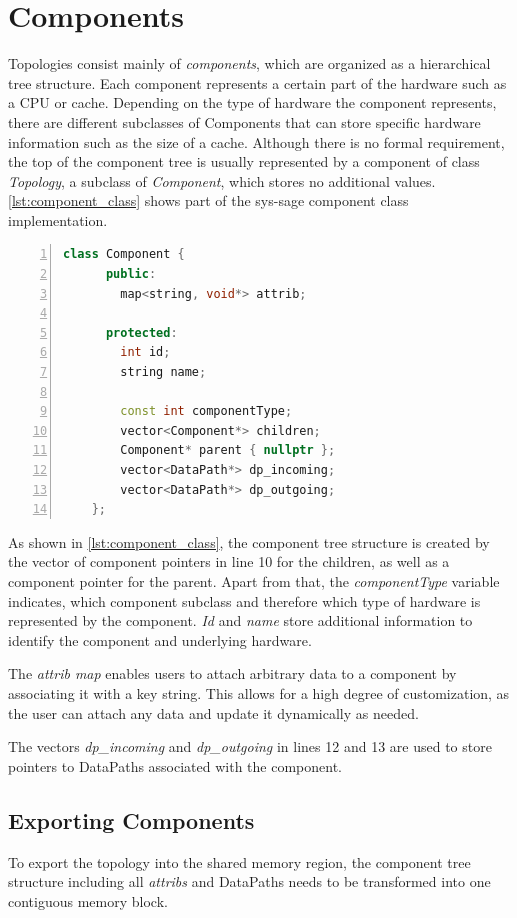 \section{Components}
Topologies consist mainly of \emph{components}, which are organized as a hierarchical tree structure.
Each component represents a certain part of the hardware such as a CPU or cache.
Depending on the type of hardware the component represents, there are different subclasses of Components that can store specific hardware information such as the size of a cache.
Although there is no formal requirement, the top of the component tree is usually represented by a component of class \emph{Topology}, a subclass of \emph{Component},
which stores no additional values.
\autoref{lst:component_class} shows part of the sys-sage component class implementation.

\begin{lstlisting}[language=c++, numbers=left, caption=Component Class, captionpos=b, label={lst:component_class}]
    class Component {
      public:
        map<string, void*> attrib;

      protected:
        int id;
        string name;

        const int componentType;
        vector<Component*> children;
        Component* parent { nullptr };
        vector<DataPath*> dp_incoming;
        vector<DataPath*> dp_outgoing;
    };
\end{lstlisting}

As shown in \autoref{lst:component_class}, the component tree structure is created by the vector of component pointers in line 10 for the children, as well as a component pointer
for the parent.
Apart from that, the \emph{componentType} variable indicates, which component subclass and therefore which type of hardware is represented by the component.
\emph{Id} and \emph{name} store additional information to identify the component and underlying hardware.

The \emph{attrib map} enables users to attach arbitrary data to a component by associating it with a key string. This allows for a high degree of customization,
as the user can attach any data and update it dynamically as needed.

The vectors \emph{dp\_incoming} and \emph{dp\_outgoing} in lines 12 and 13 are used to store pointers to DataPaths associated with the component.

\subsection{Exporting Components}\label{subsection:export_components}
To export the topology into the shared memory region, the component tree structure including all \emph{attribs} and DataPaths needs to be transformed into one contiguous memory block.

